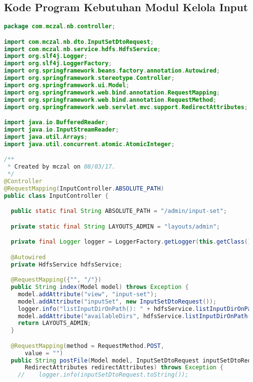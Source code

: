 \subsection{Kode Program Kebutuhan Modul Kelola Input}
 
%
%


\begin{lstlisting}[language=Java,basicstyle=\tiny,caption=InputController.java]
package com.mczal.nb.controller;

import com.mczal.nb.dto.InputSetDtoRequest;
import com.mczal.nb.service.hdfs.HdfsService;
import org.slf4j.Logger;
import org.slf4j.LoggerFactory;
import org.springframework.beans.factory.annotation.Autowired;
import org.springframework.stereotype.Controller;
import org.springframework.ui.Model;
import org.springframework.web.bind.annotation.RequestMapping;
import org.springframework.web.bind.annotation.RequestMethod;
import org.springframework.web.servlet.mvc.support.RedirectAttributes;

import java.io.BufferedReader;
import java.io.InputStreamReader;
import java.util.Arrays;
import java.util.concurrent.atomic.AtomicInteger;

/**
 * Created by mczal on 08/03/17.
 */
@Controller
@RequestMapping(InputController.ABSOLUTE_PATH)
public class InputController {

  public static final String ABSOLUTE_PATH = "/admin/input-set";

  private static final String LAYOUTS_ADMIN = "layouts/admin";

  private final Logger logger = LoggerFactory.getLogger(this.getClass());

  @Autowired
  private HdfsService hdfsService;

  @RequestMapping({"", "/"})
  public String index(Model model) throws Exception {
    model.addAttribute("view", "input-set");
    model.addAttribute("inputSet", new InputSetDtoRequest());
    logger.info("listInputDirOnPath(): " + hdfsService.listInputDirOnPath().toString());
    model.addAttribute("availableDirs", hdfsService.listInputDirOnPath());
    return LAYOUTS_ADMIN;
  }

  @RequestMapping(method = RequestMethod.POST,
      value = "")
  public String postFile(Model model, InputSetDtoRequest inputSetDtoRequest,
      RedirectAttributes redirectAttributes) throws Exception {
    //    logger.info(inputSetDtoRequest.toString());


\end{lstlisting}
